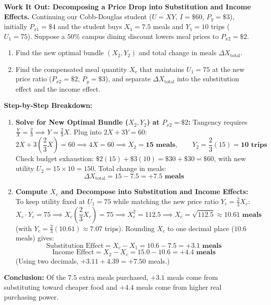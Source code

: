 \documentclass[11pt,letterpaper]{article}
\begin{document}
\noindent\textbf{Work It Out: Decomposing a Price Drop into Substitution and Income Effects.}
Continuing our Cobb-Douglas student ($U = XY$, $I = \$60$, $P_y = \$3$), initially $P_{x1} = \$4$ and the student buys $X_1 = 7.5$ meals and $Y_1 = 10$ trips ($U_1 = 75$). Suppose a $50\%$ campus dining discount lowers meal prices to $P_{x2} = \$2$.
\begin{enumerate}
    \item Find the new optimal bundle $(X_2, Y_2)$ and total change in meals $\Delta X_{\text{total}}$.
    \item Find the compensated meal quantity $X_c$ that maintains $U_1 = 75$ at the new price ratio ($P_{x2} = \$2$, $P_y = \$3$), and separate $\Delta X_{\text{total}}$ into the substitution effect and the income effect.
\end{enumerate}

\noindent\textbf{Step-by-Step Breakdown:}
\begin{enumerate}
    \item \textbf{Solve for New Optimal Bundle ($X_2, Y_2$) at $P_{x2} = \$2$:}
    Tangency requires $\frac{Y}{X} = \frac{2}{3} \implies Y = \frac{2}{3}X$. Plug into $2X + 3Y = 60$:
    \[
    2X + 3\left(\frac{2}{3}X\right) = 60 \implies 4X = 60 \implies X_2 = \mathbf{15\text{ meals}}, \qquad Y_2 = \frac{2}{3}(15) = \mathbf{10\text{ trips}}
    \]
    Check budget exhaustion: $\$2(15) + \$3(10) = \$30 + \$30 = \$60$, with new utility $U_2 = 15 \times 10 = 150$. Total change in meals:
    \[
    \Delta X_{\text{total}} = 15 - 7.5 = \mathbf{+7.5\text{ meals}}
    \]

    \item \textbf{Compute $X_c$ and Decompose into Substitution and Income Effects:}
    To keep utility fixed at $U_1 = 75$ while matching the new price ratio $Y_c = \frac{2}{3}X_c$:
    \[
    X_c \cdot Y_c = 75 \implies X_c \left(\frac{2}{3}X_c\right) = 75 \implies X_c^2 = 112.5 \implies X_c = \sqrt{112.5} \approx \mathbf{10.61\text{ meals}}
    \]
    (with $Y_c = \frac{2}{3}(10.61) \approx 7.07$ trips). Rounding $X_c$ to one decimal place ($10.6$ meals) gives:
    \[
    \text{Substitution Effect} = X_c - X_1 = 10.6 - 7.5 = \mathbf{+3.1\text{ meals}}
    \]
    \[
    \text{Income Effect} = X_2 - X_c = 15.0 - 10.6 = \mathbf{+4.4\text{ meals}}
    \]
    (Using two decimals, $+3.11 + 4.39 = +7.50$ meals.)
\end{enumerate}
\textbf{Conclusion:} Of the $7.5$ extra meals purchased, $+3.1$ meals come from substituting toward cheaper food and $+4.4$ meals come from higher real purchasing power.
\end{document}

